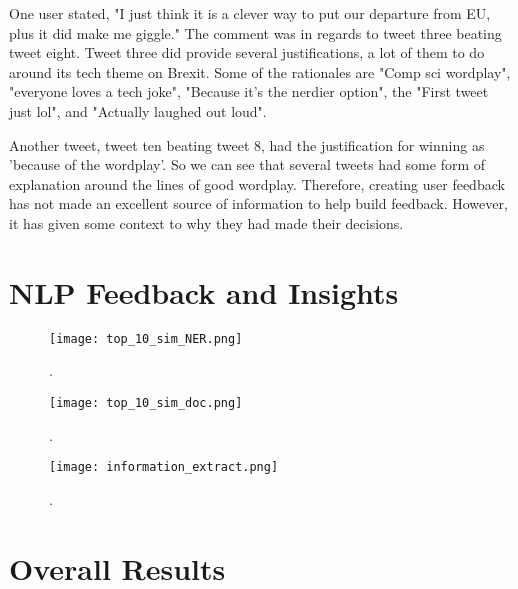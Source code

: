 	One user stated, "I just think it is a clever way to put our departure from EU, plus it did make me giggle." The comment was in regards to tweet three beating tweet eight. Tweet three did provide several justifications, a lot of them to do around its tech theme on Brexit. Some of the rationales are "Comp sci wordplay", "everyone loves a tech joke", "Because it's the nerdier option", the "First tweet just lol", and "Actually laughed out loud".
	
	Another tweet, tweet ten beating tweet 8, had the justification for winning as 'because of the wordplay'. So we can see that several tweets had some form of explanation around the lines of good wordplay. Therefore, creating user feedback has not made an excellent source of information to help build feedback. However, it has given some context to why they had made their decisions.


\section{NLP Feedback and Insights}
\label{sec:reaults_NLP}
	
	\begin{figure}[h]
		\centering
		\texttt{[image: top\_10\_sim\_NER.png]}
		\caption{.}
		\label{fig:top_10_sim_NER}
		
	\end{figure}

		\begin{figure}[h]
		\centering
		\texttt{[image: top\_10\_sim\_doc.png]}
		\caption{.}
		\label{fig:top_10_sim_doc}
		
	\end{figure}

	\begin{figure}[h]
		\centering
		\texttt{[image: information\_extract.png]}
		\caption{.}
		\label{fig:information_extract}
		
	\end{figure}

\section{Overall Results}
\label{sec:reaults_NLP}


